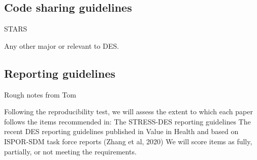 \subsection{Code sharing guidelines} \label{sec:code}
\timeno

STARS

Any other major or relevant to DES.

\subsection{Reporting guidelines} \label{sec:reporting}
\timeno


Rough notes from Tom

Following the reproducibility test, we will assess the extent to which each paper follows the items recommended in:
The STRESS-DES reporting guidelines
The recent DES reporting guidelines published in Value in Health and based on ISPOR-SDM task force reports (Zhang et al, 2020)
We will score items as fully, partially, or not meeting the requirements.
